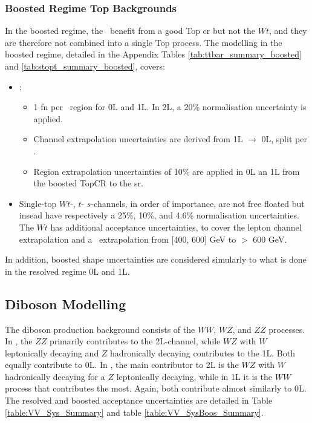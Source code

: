 \subsubsection{Boosted Regime Top Backgrounds} 
In the boosted regime, the \ttb\ benefit from a good Top \gls{cr} but not the $Wt$, and they are therefore not combined into a single Top process. The modelling in the boosted regime, detailed in the Appendix Tables \ref{tab:ttbar_summary_boosted} and \ref{tab:stopt_summary_boosted}, covers:
\begin{itemize}[leftmargin=*]
    \item \ttb: 
    \begin{itemize}
        \item 1 \gls{fn} per \ptv\ region for 0L and 1L. In 2L, a 20\% normalisation uncertainty is applied. 
        \item Channel extrapolation uncertainties are derived from 1L $\rightarrow$ 0L, split per \ptv.
        \item Region extrapolation uncertainties of 10\% are applied in 0L an 1L from the boosted TopCR to the \gls{sr}.
    \end{itemize}
    \item Single-top $Wt$-, $t$- $s$-channels, in order of importance, are not free floated but insead have respectively a 25\%, 10\%, and 4.6\% normalisation uncertainties. The $Wt$ has additional acceptance uncertainties, to cover the lepton channel extrapolation and a \ptv\ extrapolation from [400, 600] GeV to $>$ 600 GeV. 
\end{itemize}
In addition, boosted shape uncertainties are considered simularly to what is done in the resolved regime 0L and 1L.

\subsection{Diboson Modelling}
The diboson production background consists of the $WW$, $WZ$, and $ZZ$ processes. In \vhb, the $ZZ$ primarily contributes to the 2L-channel, while $WZ$ with $W$ leptonically decaying and $Z$ hadronically decaying contributes to the 1L. Both equally contribute to 0L. In \vhc, the main contributor to 2L is the $WZ$ with $W$ hadronically decaying for a $Z$ leptonically decaying, while in 1L it is the $WW$ process that contributes the most. Again, both contribute almost similarly to 0L. The resolved and boosted acceptance uncertainties are detailed in Table \ref{table:VV_Sys_Summary} and table \ref{table:VV_SysBoos_Summary}. \\

